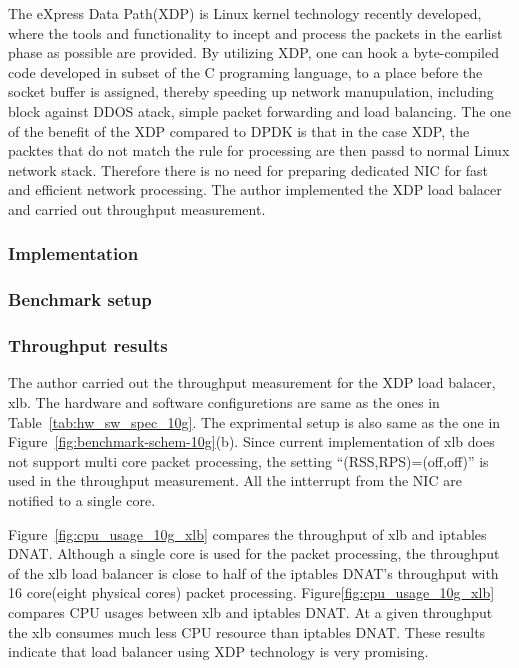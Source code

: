 The eXpress Data Path(XDP) is Linux kernel technology recently developed, where the tools and functionality to incept and process the packets in the earlist phase as possible are provided.
By utilizing XDP, one can hook a byte-compiled code developed in subset of the C programing language, to a place before the socket buffer is assigned, thereby speeding up network manupulation, including block against DDOS atack, simple packet forwarding and load balancing.
The one of the benefit of the XDP compared to DPDK is that in the case XDP, the packtes that do not match the rule for processing are then passd to normal Linux network stack.
Therefore there is no need for preparing dedicated NIC for fast and efficient network processing.
The author implemented the XDP load balacer and carried out throughput measurement.

\subsubsection{Implementation}

\subsubsection{Benchmark setup}

\subsubsection{Throughput results }

The author carried out the throughput measurement for the XDP load balacer, xlb.
The hardware and software configuretions are same as the ones in Table~\ref{tab:hw_sw_spec_10g}.
The exprimental setup is also same as the one in Figure~\ref{fig:benchmark-schem-10g}(b).
Since current implementation of xlb does not support multi core packet processing, the setting \enquote{(RSS,RPS)=(off,off)} is used in the throughput measurement.
All the intterrupt from the NIC are notified to a single core.

Figure~\ref{fig:cpu_usage_10g_xlb} compares the throughput of xlb and iptables DNAT. 
Although a single core is used for the packet processing, the throughput of the xlb load balancer is close to half of the iptables DNAT's throughput with 16 core(eight physical cores) packet processing.
Figure\ref{fig:cpu_usage_10g_xlb} compares CPU usages between xlb and iptables DNAT.
At a given throughput the xlb consumes much less CPU resource than iptables DNAT.
These results indicate that load balancer using XDP technology is very promising.

